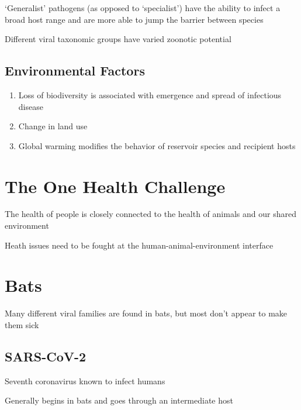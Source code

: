 \documentclass{notes}
\begin{document}
`Generalist' pathogens (as opposed to `specialist') have the ability to infect a broad host range and are more able to jump the barrier between species

Different viral taxonomic groups have varied zoonotic potential


\subsection{Environmental Factors}

\begin{enumerate}
    \item Loss of biodiversity is associated with emergence and spread of infectious disease
    \item Change in land use
    \item Global warming modifies the behavior of reservoir species and recipient hosts
\end{enumerate}

\section{The One Health Challenge}

The health of people is closely connected to the health of animals and our shared environment

\tab \indicates Heath issues need to be fought at the human-animal-environment interface

\section{Bats}

Many different viral families are found in bats, but most don't appear to make them sick


\subsection{SARS-CoV-2}

Seventh coronavirus known to infect humans

\tab \indicates Generally begins in bats and goes through an intermediate host

\end{document}

